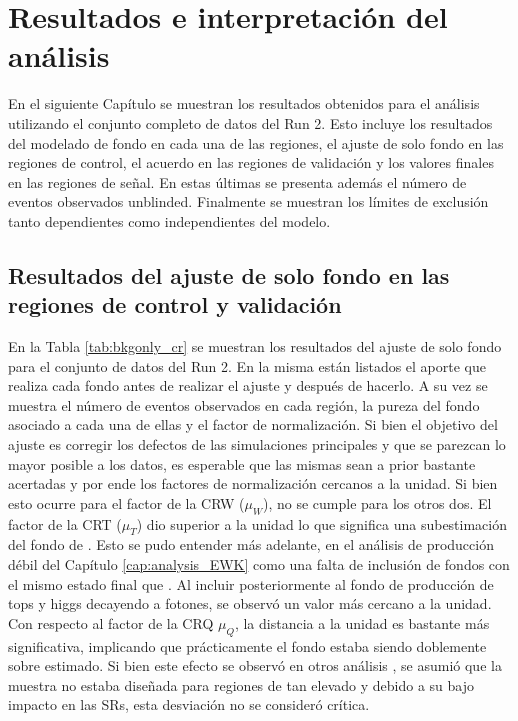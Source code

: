 \chapter{Resultados e interpretación del análisis}

En el siguiente Capítulo se muestran los resultados obtenidos para el análisis utilizando el conjunto completo de datos del Run 2. Esto incluye los resultados del modelado de fondo en cada una de las regiones, el ajuste de solo fondo en las regiones de control, el acuerdo en las regiones de validación y los valores finales en las regiones de señal. En estas últimas se presenta además el número de eventos observados unblinded. Finalmente se muestran los límites de exclusión tanto dependientes como independientes del modelo. 

\section{Resultados del ajuste de solo fondo en las regiones de control y validación}


En la Tabla \ref{tab:bkgonly_cr} se muestran los resultados del ajuste de solo fondo para el conjunto de datos del Run 2. En la misma están listados el aporte que realiza cada fondo antes de realizar el ajuste y después de hacerlo. A su vez se muestra el número de eventos observados en cada región, la pureza del fondo asociado a cada una de ellas y el factor de normalización. Si bien el objetivo del ajuste es corregir los defectos de las simulaciones principales y que se parezcan lo mayor posible a los datos, es esperable que las mismas sean a prior bastante acertadas y por ende los factores de normalización cercanos a la unidad. Si bien esto ocurre para el factor de la CRW ($\mu_W$), no se cumple para los otros dos. El factor de la CRT ($\mu_T$) dio superior a la unidad lo que significa una subestimación del fondo de \ttbarph. Esto se pudo entender más adelante, en el análisis de producción débil del Capítulo \ref{cap:analysis_EWK} como una falta de inclusión de fondos con el mismo estado final que \ttbarph. Al incluir posteriormente al fondo de producción de tops y higgs decayendo a fotones, se observó un valor más cercano a la unidad. Con respecto al factor de la CRQ $\mu_Q$, la distancia a la unidad es bastante más significativa, implicando que prácticamente el fondo estaba siendo doblemente sobre estimado. Si bien este efecto se observó en otros análisis \cite{Alonso:2689095} , se asumió que la muestra no estaba diseñada para regiones de tan elevado \met y debido a su bajo impacto en las SRs, esta desviación no se consideró crítica. 

